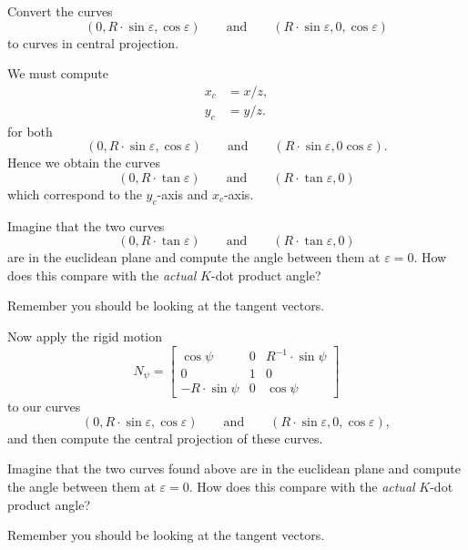 \documentclass{ximera}
\begin{document}
\begin{problem}
  Convert the curves
  \[
  (0, R\cdot\sin\varepsilon,\cos\varepsilon)\qquad\text{and}\qquad(R\cdot \sin\varepsilon, 0, \cos\varepsilon)
  \]
  to curves in central projection.
  \begin{freeResponse}
    We must compute
    \begin{align*}
      x_{c} &=x/z,\\
      y_{c} &=y/z.
    \end{align*}
    for both
      \[
  (0, R\cdot\sin\varepsilon,\cos\varepsilon)\qquad\text{and}\qquad(R\cdot
      \sin\varepsilon, 0 \cos\varepsilon).
      \]
      Hence we obtain the curves
      \[
      (0,R\cdot\tan\varepsilon)\qquad\text{and}\qquad(R\cdot\tan\varepsilon,0)
      \]
      which correspond to the $y_c$-axis and $x_c$-axis.
  \end{freeResponse}
\end{problem}

\begin{problem}
  Imagine that the two curves
  \[
  (0,R\cdot\tan\varepsilon)\qquad\text{and}\qquad(R\cdot\tan\varepsilon,0)
  \]
  are in the euclidean plane and compute the angle between them at
  $\varepsilon=0$.  How does this compare with the \textit{actual}
  $K$-dot product angle?
  \begin{hint}
    Remember you should be looking at the tangent vectors.
  \end{hint}
\end{problem}

\begin{problem}
  Now apply the rigid motion
  \[
  N_\psi=
 \begin{bmatrix}
   \cos\psi & 0 & R^{-1}\cdot\sin\psi\\
   0 & 1 & 0\\
   -R\cdot\sin\psi & 0 & \cos\psi
 \end{bmatrix}
 \]
 to our curves
 \[
 (0, R\cdot\sin\varepsilon,\cos\varepsilon)\qquad\text{and}\qquad(R\cdot
 \sin\varepsilon, 0, \cos\varepsilon),
 \]
 and then compute the central projection of these curves.
\end{problem}

\begin{problem}
  Imagine that the two curves found above are in the euclidean plane
  and compute the angle between them at $\varepsilon = 0$.  How does
  this compare with the \textit{actual} $K$-dot product angle?
  \begin{hint}
    Remember you should be looking at the tangent vectors.
  \end{hint}
\end{problem}
\end{document}
